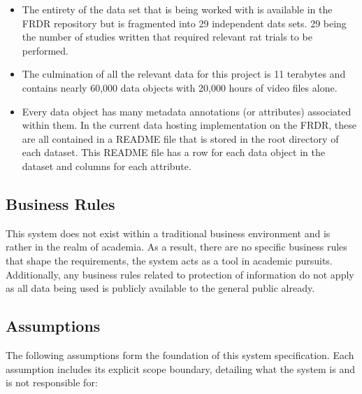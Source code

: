 \documentclass[12pt]{article}
\begin{document}
\begin{itemize}
    \item The entirety of the data set that is being worked with is available in the FRDR repository
    but is fragmented into 29 independent dats sets. 29 being the number of studies written that required relevant
    rat trials to be performed.
    \item The culmination of all the relevant data for this project is 11 terabytes and contains nearly 60,000 data objects with
    20,000 hours of video files alone.
    \item Every data object has many metadata annotations (or attributes) associated within them. In the current data hosting
    implementation on the FRDR, these are all contained in a README file that is stored in the root directory of each dataset.
    This README file has a row for each data object in the dataset and columns for each attribute.
\end{itemize}

\subsection{Business Rules}

    \par{This system does not exist within a traditional business environment and is
    rather in the realm of academia. As a result, there are no specific business rules that shape
    the requirements, the system acts as a tool in academic pursuits. Additionally, any business rules
    related to protection of information do not apply as all data being used is publicly available to
    the general public already. }

\subsection{Assumptions}

The following assumptions form the foundation of this system specification. Each assumption includes its explicit scope boundary, detailing what the system is and is not responsible for:
\end{document}
